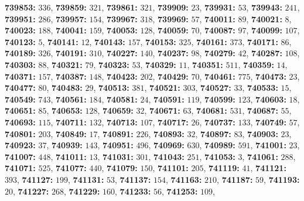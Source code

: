 \textsf{\bfseries 739853:} $336$, \textsf{\bfseries 739859:} $321$, \textsf{\bfseries 739861:} $321$, \textsf{\bfseries 739909:} $23$, \textsf{\bfseries 739931:} $53$, \textsf{\bfseries 739943:} $241$, \textsf{\bfseries 739951:} $286$, \textsf{\bfseries 739957:} $154$, \textsf{\bfseries 739967:} $318$, \textsf{\bfseries 739969:} $57$, \textsf{\bfseries 740011:} $89$, \textsf{\bfseries 740021:} $8$, \textsf{\bfseries 740023:} $188$, \textsf{\bfseries 740041:} $159$, \textsf{\bfseries 740053:} $128$, \textsf{\bfseries 740059:} $70$, \textsf{\bfseries 740087:} $97$, \textsf{\bfseries 740099:} $107$, \textsf{\bfseries 740123:} $5$, \textsf{\bfseries 740141:} $12$, \textsf{\bfseries 740143:} $157$, \textsf{\bfseries 740153:} $325$, \textsf{\bfseries 740161:} $373$, \textsf{\bfseries 740171:} $86$, \textsf{\bfseries 740189:} $326$, \textsf{\bfseries 740191:} $310$, \textsf{\bfseries 740227:} $140$, \textsf{\bfseries 740237:} $98$, \textsf{\bfseries 740279:} $42$, \textsf{\bfseries 740287:} $108$, \textsf{\bfseries 740303:} $88$, \textsf{\bfseries 740321:} $79$, \textsf{\bfseries 740323:} $53$, \textsf{\bfseries 740329:} $11$, \textsf{\bfseries 740351:} $511$, \textsf{\bfseries 740359:} $14$, \textsf{\bfseries 740371:} $157$, \textsf{\bfseries 740387:} $148$, \textsf{\bfseries 740423:} $202$, \textsf{\bfseries 740429:} $70$, \textsf{\bfseries 740461:} $775$, \textsf{\bfseries 740473:} $23$, \textsf{\bfseries 740477:} $80$, \textsf{\bfseries 740483:} $29$, \textsf{\bfseries 740513:} $381$, \textsf{\bfseries 740521:} $303$, \textsf{\bfseries 740527:} $33$, \textsf{\bfseries 740533:} $15$, \textsf{\bfseries 740549:} $743$, \textsf{\bfseries 740561:} $184$, \textsf{\bfseries 740581:} $24$, \textsf{\bfseries 740591:} $119$, \textsf{\bfseries 740599:} $123$, \textsf{\bfseries 740603:} $18$, \textsf{\bfseries 740651:} $85$, \textsf{\bfseries 740653:} $128$, \textsf{\bfseries 740659:} $32$, \textsf{\bfseries 740671:} $63$, \textsf{\bfseries 740681:} $531$, \textsf{\bfseries 740687:} $55$, \textsf{\bfseries 740693:} $115$, \textsf{\bfseries 740711:} $132$, \textsf{\bfseries 740713:} $107$, \textsf{\bfseries 740717:} $26$, \textsf{\bfseries 740737:} $133$, \textsf{\bfseries 740749:} $57$, \textsf{\bfseries 740801:} $203$, \textsf{\bfseries 740849:} $17$, \textsf{\bfseries 740891:} $226$, \textsf{\bfseries 740893:} $32$, \textsf{\bfseries 740897:} $83$, \textsf{\bfseries 740903:} $23$, \textsf{\bfseries 740923:} $37$, \textsf{\bfseries 740939:} $143$, \textsf{\bfseries 740951:} $496$, \textsf{\bfseries 740969:} $630$, \textsf{\bfseries 740989:} $591$, \textsf{\bfseries 741001:} $23$, \textsf{\bfseries 741007:} $448$, \textsf{\bfseries 741011:} $13$, \textsf{\bfseries 741031:} $301$, \textsf{\bfseries 741043:} $251$, \textsf{\bfseries 741053:} $3$, \textsf{\bfseries 741061:} $288$, \textsf{\bfseries 741071:} $525$, \textsf{\bfseries 741077:} $440$, \textsf{\bfseries 741079:} $150$, \textsf{\bfseries 741101:} $205$, \textsf{\bfseries 741119:} $41$, \textsf{\bfseries 741121:} $393$, \textsf{\bfseries 741127:} $199$, \textsf{\bfseries 741131:} $53$, \textsf{\bfseries 741137:} $154$, \textsf{\bfseries 741163:} $210$, \textsf{\bfseries 741187:} $59$, \textsf{\bfseries 741193:} $20$, \textsf{\bfseries 741227:} $268$, \textsf{\bfseries 741229:} $160$, \textsf{\bfseries 741233:} $56$, \textsf{\bfseries 741253:} $109$, 
